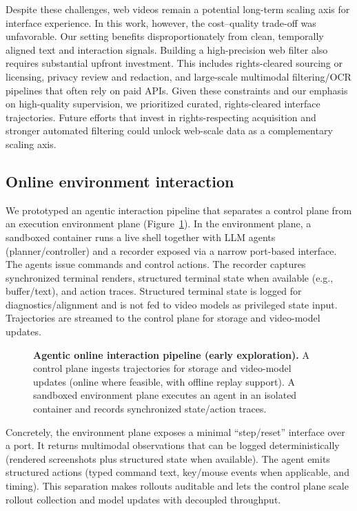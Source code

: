 Despite these challenges, web videos remain a potential long-term scaling axis for interface experience.
In this work, however, the cost--quality trade-off was unfavorable.
Our setting benefits disproportionately from clean, temporally aligned text and interaction signals.
Building a high-precision web filter also requires substantial upfront investment.
This includes rights-cleared sourcing or licensing, privacy review and redaction, and large-scale multimodal filtering/OCR pipelines that often rely on paid APIs.
Given these constraints and our emphasis on high-quality supervision, we prioritized curated, rights-cleared interface trajectories.
Future efforts that invest in rights-respecting acquisition and stronger automated filtering could unlock web-scale data as a complementary scaling axis.

\subsection{Online environment interaction}
We prototyped an agentic interaction pipeline that separates a control plane from an execution environment plane (Figure~\ref{fig:online-interaction-pipeline}).
In the environment plane, a sandboxed container runs a live shell together with LLM agents (planner/controller) and a recorder exposed via a narrow port-based interface.
The agents issue commands and control actions.
The recorder captures synchronized terminal renders, structured terminal state when available (e.g., buffer/text), and action traces.
Structured terminal state is logged for diagnostics/alignment and is not fed to video models as privileged state input.
Trajectories are streamed to the control plane for storage and video-model updates.

\begin{figure}[h]
  \centering
  
  \vspace{-1.4em}
  \caption{\textbf{Agentic online interaction pipeline (early exploration).}
  A control plane ingests trajectories for storage and video-model updates (online where feasible, with offline replay support).
  A sandboxed environment plane executes an agent in an isolated container and records synchronized state/action traces.}
  \vspace{-10pt}
  \label{fig:online-interaction-pipeline}
\end{figure}


Concretely, the environment plane exposes a minimal ``step/reset'' interface over a port.
It returns multimodal observations that can be logged deterministically (rendered screenshots plus structured state when available).
The agent emits structured actions (typed command text, key/mouse events when applicable, and timing).
This separation makes rollouts auditable and lets the control plane scale rollout collection and model updates with decoupled throughput.

